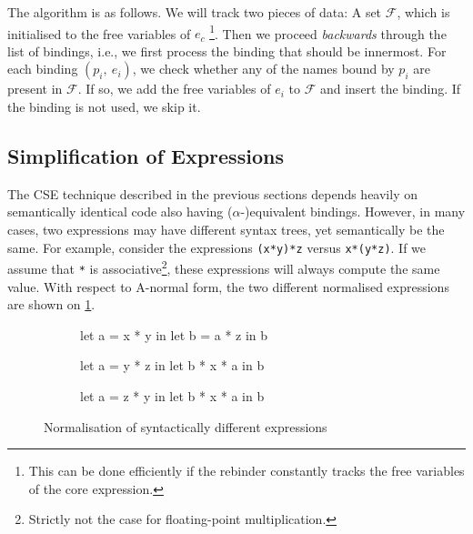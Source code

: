 The algorithm is as follows.  We will track two pieces of data: A set
$\mathcal{F}$, which is initialised to the free variables of $e_{c}$
\footnote{This can be done efficiently if the rebinder constantly
  tracks the free variables of the core expression.}.  Then we proceed
\textit{backwards} through the list of bindings, i.e., we first
process the binding that should be innermost.  For each binding
$(p_{i},~e_{i})$, we check whether any of the names bound by $p_{i}$
are present in $\mathcal{F}$.  If so, we add the free variables of
$e_{i}$ to $\mathcal{F}$ and insert the binding.  If the binding is
not used, we skip it.

\subsection{Simplification of Expressions}
\label{sec:simplification-of-expressions}

The CSE technique described in the previous sections depends heavily
on semantically identical code also having ($\alpha$-)equivalent
bindings.  However, in many cases, two expressions may have different
syntax trees, yet semantically be the same.  For example, consider the
expressions \texttt{(x*y)*z} versus \texttt{x*(y*z)}.  If we assume
that \texttt{*} is associative\footnote{Strictly not the case for
  floating-point multiplication.}, these expressions will always
compute the same value.  With respect to A-normal form, the two
different normalised expressions are shown on
\cref{fig:differing-normalisation}.

\begin{figure}
\begin{subfigure}[t]{.33\textwidth}
\centering
\begin{colorcode}
let a = x * y in
let b = a * z in
b
\end{colorcode}
\end{subfigure}%
\begin{subfigure}[t]{.33\textwidth}
\centering
\begin{colorcode}
let a = y * z in
let b * x * a in
b
\end{colorcode}
\end{subfigure}%
\begin{subfigure}[t]{.33\textwidth}
\centering
\begin{colorcode}
let a = z * y in
let b * x * a in
b
\end{colorcode}
\end{subfigure}
\caption{Normalisation of syntactically different expressions}
\label{fig:differing-normalisation}
\end{figure}

